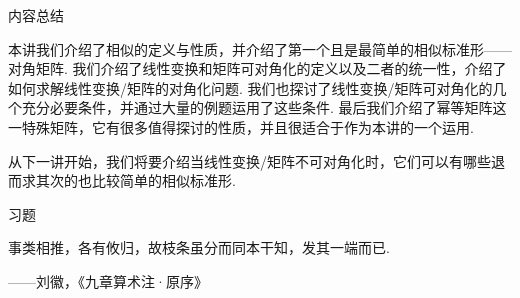 \vspace{2ex}
\centerline{\heiti \Large 内容总结}

本讲我们介绍了相似的定义与性质，并介绍了第一个且是最简单的相似标准形——对角矩阵. 我们介绍了线性变换和矩阵可对角化的定义以及二者的统一性，介绍了如何求解线性变换/矩阵的对角化问题. 我们也探讨了线性变换/矩阵可对角化的几个充分必要条件，并通过大量的例题运用了这些条件. 最后我们介绍了幂等矩阵这一特殊矩阵，它有很多值得探讨的性质，并且很适合于作为本讲的一个运用.

从下一讲开始，我们将要介绍当线性变换/矩阵不可对角化时，它们可以有哪些退而求其次的也比较简单的相似标准形.

\vspace{2ex}
\centerline{\heiti \Large 习题}

\vspace{2ex}
{\kaishu 事类相推，各有攸归，故枝条虽分而同本干知，发其一端而已.}
\begin{flushright}
    \kaishu
    ——刘徽，《九章算术注·原序》
\end{flushright}

